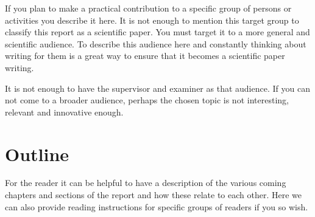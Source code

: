If you plan to make a practical contribution to a specific group of persons or activities you describe it here. It is not enough to mention this target group to classify this report as a scientific paper. You must target it to a more general and scientific audience. To describe this audience here and constantly thinking about writing for them is a great way to ensure that it becomes a scientific paper writing.

It is not enough to have the supervisor and examiner as that audience. If you can not come to a broader audience, perhaps the  chosen topic is not interesting, relevant and innovative enough.

\section{Outline}
For the reader it can be helpful to have a description of the various coming chapters and sections of the report and how these relate to each other. Here we can also provide reading instructions for specific groups of readers if you so wish.
